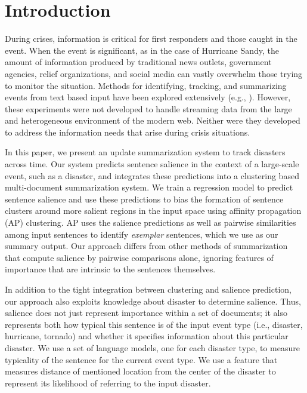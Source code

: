\section{Introduction}
\label{sec:introduction}
During crises, information is critical for first responders and those caught
in the event.  When the event is significant, as in the case of Hurricane
Sandy, the amount of information produced by traditional news outlets,
government agencies, relief organizations, and social media can vastly
overwhelm those trying to monitor the situation. Methods for identifying,
tracking, and summarizing events from text based input have been explored
extensively
(e.g.,
\cite{allan1998topic,Filatova&Hatzivassiloglou.04a,Wang&al.11}). However,
these experiments were not developed to handle streaming data from  the large and heterogeneous
environment of the modern web. Neither were they developed to address the
information needs that arise during  crisis
situations. 

In this paper, we present an update summarization system to track disasters
across time. Our system predicts sentence salience in the context of a
large-scale event, such as a disaster,  and integrates these predictions into
a clustering based multi-document summarization system. We train a regression
model to predict sentence salience and use these predictions to bias the
formation of sentence clusters around more salient regions in the input space
using affinity propagation (AP) clustering.  AP uses the salience predictions
as well as pairwise similarities among input sentences to identify
\emph{exemplar} sentences, which we use as our summary output.  Our approach
differs from other methods of summarization that compute salience by pairwise
comparisons alone, ignoring features of importance that are intrinsic to the
sentences themselves.

In addition to the tight integration between clustering and salience
prediction, our approach also exploits knowledge about disaster to determine
salience. Thus, salience does not just represent importance within a set of
documents; it also represents both how typical this sentence is of the input event
type (i.e., disaster, hurricane, tornado) and whether it specifies information
about this particular disaster. We use a set of language models, one for each
disaster type, to measure typicality of the sentence for the current event type. We
use a feature that measures distance of mentioned location from the center of
the disaster to represent its likelihood of referring to the input disaster. 




